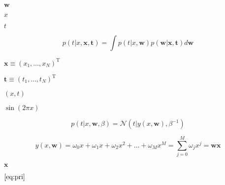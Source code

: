 \documentclass[10pt]{book}
\begin{document}
\begin{mdSnippets}
\begin{mdInlineSnippet}[e8d1025023b4b2aa1dda755aa92e085d]
$\textbf{w}$\end{mdInlineSnippet}%
\begin{mdInlineSnippet}[9dd4e461268c8034f5c8564e155c67a6]%
$x$\end{mdInlineSnippet}%
\begin{mdInlineSnippet}[e358efa489f58062f10dd7316b65649e]%
$t$\end{mdInlineSnippet}%
\begin{mdDisplaySnippet}[ab56d80dfeaa758a9d096860017a8895]%
\[%
p(t|x,\textbf{x},\textbf{t})=\int
p(t|x,\textbf{w})p(\textbf{w}|\textbf{x},\textbf{t})d\textbf{w} 
\]%
\end{mdDisplaySnippet}%
\begin{mdInlineSnippet}[be2652f44e06c59bf28f3a2d06ba8ffe]%
$\textbf{x}\equiv (x_1,\dots,x_N)^\mathrm{T}$\end{mdInlineSnippet}%
\begin{mdInlineSnippet}[45185819e87715c1d1c7e37843a42969]%
$\textbf{t}\equiv(t_1,\dots,t_N)^\mathrm{T}$\end{mdInlineSnippet}%
\begin{mdInlineSnippet}[bc55d7473bb8614df896fa1d7f9befd3]%
$(x,t)$\end{mdInlineSnippet}%
\begin{mdInlineSnippet}%
$\sin(2\pi x)$\end{mdInlineSnippet}%
\begin{mdDisplaySnippet}[c2be9560409fadc6ab534982ee0cc3d2]%
\[%
p(t|x,\textbf{w},\beta)=\mathcal{N}(t|y(x,\textbf{w}),\beta^{-1})
\]%
\end{mdDisplaySnippet}%
\begin{mdDisplaySnippet}[37f9364a6be1b465959928b33f89924f]%
\[%
y(x,\textbf{w})=\omega{}_0x+\omega{}_1x+\omega{}_2x^2+\dots{}+\omega{}_Mx^M=\sum_{j=0}^{M} \omega{}_jx^j=\textbf{w}\textbf{x}
\]%
\end{mdDisplaySnippet}%
\begin{mdInlineSnippet}[ab61a819569bd16109fdb5c357cb55e2]%
$\textbf{x}$\end{mdInlineSnippet}%
\begin{mdInlineSnippet}[2423918327c40d06b95d018244ce34f1]%
$\eqref{eq:pri}$\end{mdInlineSnippet}%

\end{mdSnippets}
\end{document}
